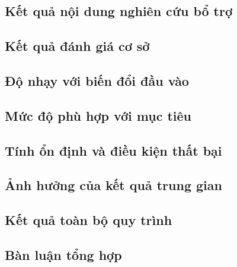 \par{}
\subsection{Kết quả nội dung nghiên cứu bổ trợ}\label{subsection:results-8}

\par{}
\subsection{Kết quả đánh giá cơ sở}\label{subsection:results-9}

\par{}
\subsection{Độ nhạy với biến đổi đầu vào}\label{subsection:results-10}

\par{}
\subsection{Mức độ phù hợp với mục tiêu}\label{subsection:results-11}

\par{}
\subsection{Tính ổn định và điều kiện thất bại}\label{subsection:results-12}

\par{}
\subsection{Ảnh hưởng của kết quả trung gian}\label{subsection:results-13}

\par{}
\subsection{Kết quả toàn bộ quy trình}\label{subsection:results-14}

\par{}
\subsection{Bàn luận tổng hợp}\label{subsection:results-15}

